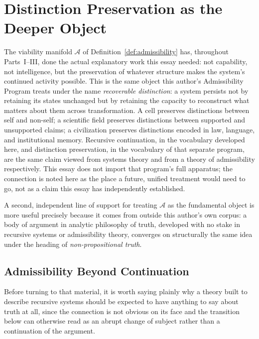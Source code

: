\documentclass[11pt,a4paper]{article}
\theoremstyle{plain}
\theoremstyle{definition}
\theoremstyle{remark}
\newcommand{\Adm}{\mathcal{A}}
\begin{document}
\section{Distinction Preservation as the Deeper Object}
\label{sec:distinction-preservation}

The viability manifold $\Adm$ of Definition~\ref{def:admissibility} has, throughout Parts~I--III, done the actual explanatory work this essay needed: not capability, not intelligence, but the preservation of whatever structure makes the system's continued activity possible. This is the same object this author's Admissibility Program treats under the name \emph{recoverable distinction}: a system persists not by retaining its states unchanged but by retaining the capacity to reconstruct what matters about them across transformation. A cell preserves distinctions between self and non-self; a scientific field preserves distinctions between supported and unsupported claims; a civilization preserves distinctions encoded in law, language, and institutional memory. Recursive continuation, in the vocabulary developed here, and distinction preservation, in the vocabulary of that separate program, are the same claim viewed from systems theory and from a theory of admissibility respectively. This essay does not import that program's full apparatus; the connection is noted here as the place a future, unified treatment would need to go, not as a claim this essay has independently established.

A second, independent line of support for treating $\Adm$ as the fundamental object is more useful precisely because it comes from outside this author's own corpus: a body of argument in analytic philosophy of truth, developed with no stake in recursive systems or admissibility theory, converges on structurally the same idea under the heading of \emph{non-propositional truth}.

\subsection{Admissibility Beyond Continuation}
\label{subsec:admissibility-beyond-continuation}

Before turning to that material, it is worth saying plainly why a theory built to describe recursive systems should be expected to have anything to say about truth at all, since the connection is not obvious on its face and the transition below can otherwise read as an abrupt change of subject rather than a continuation of the argument.
\end{document}
